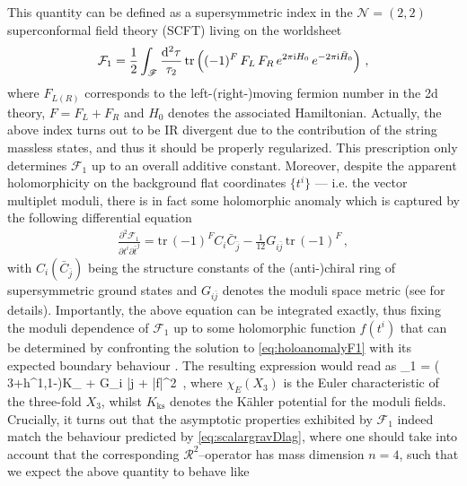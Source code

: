 This quantity can be defined as a supersymmetric index in the $\mathcal{N}=(2,2)$ superconformal field theory (SCFT) living on the worldsheet \cite{Cecotti:1992vy,Cecotti:1993stu}
%
\begin{align}
\label{eq:defF_1}
	\mathcal{F}_1 = \frac12 \int_{\mathscr{F}} \frac{{\rm d}^2\tau}{\tau_2}\, \text{tr} \left( (-1)^F\, F_L\, F_R\, e^{2\pi \text{i} H_0}\, e^{-2\pi \text{i} \bar{H}_0}\right)\, ,
\end{align}
%
where $F_{L(R)}$ corresponds to the left-(right-)moving fermion number in the 2d theory, $F= F_L+F_R$ and $H_0$ denotes the associated Hamiltonian. Actually, the above index turns out to be IR divergent due to the contribution of the string massless states, and thus it should be properly regularized. This prescription only determines $\mathcal{F}_1$ up to an overall additive constant. Moreover, despite the apparent holomorphicity on the background flat coordinates $\{t^i\}$ --- i.e. the vector multiplet moduli, there is in fact some holomorphic anomaly which is captured by the following differential equation 
%
\begin{align}
\label{eq:holoanomalyF1}
	\frac{\partial^2\mathcal{F}_1}{\partial t^i \partial \bar{t}^j} = \text{tr}\, (-1)^F C_i \bar{C}_{\bar{j}} - \frac{1}{12} G_{i \bar{j}}\, \text{tr}\, (-1)^F\, ,
\end{align}
%
with $C_i (\bar{C}_{\bar{j}})$ being the structure constants of the (anti-)chiral ring of supersymmetric ground states and $G_{i \bar{j}}$ denotes the moduli space metric (see \cite{Bershadsky:1993ta} for details). Importantly, the above equation can be integrated exactly, thus fixing the moduli dependence of $\mathcal{F}_1$ up to some holomorphic function $f(t^i)$ that can be determined by confronting the solution to \eqref{eq:holoanomalyF1} with its expected boundary behaviour \cite{Bershadsky:1993ta,Bershadsky:1993cx}. The resulting expression would read as
%
\beq\label{eq:F1IIA}
	_1 =   \left( 3+h^{1,1}-\right)K_{} + \log \det G_{i \bar j} + \log|f|^2\, ,
\eeq
%  
where $\chi_E(X_3)$ is the Euler characteristic of the three-fold $X_3$, whilst $K_{\text{ks}}$ denotes the K\"ahler potential for the moduli fields. Crucially, it turns out that the asymptotic properties exhibited by $\mathcal{F}_1$ indeed match the behaviour predicted by \eqref{eq:scalargravDlag}, where one should take into account that the corresponding $\mathcal{R}^2$--operator has mass dimension $n=4$, such that we expect the above quantity to behave like 
%
\beq\label{eq:F1QGcutoff}
